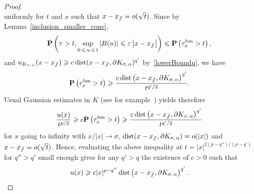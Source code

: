 \documentclass[AHL,Unicode,longabstracts,published]{cedram}
\DeclareMathOperator{\bm}{bm}
\DeclareMathOperator{\dist}{dist}
\newcommand{\pr}{\mathbf{P}}
\renewcommand{\epsilon}{\varepsilon}
\renewcommand{\leq}{\leqslant}
\renewcommand{\geq}{\geqslant}
\newcommand{\sslash}{\slash\mkern-6.4mu\slash}
\begin{document}
\begin{proof}
\[\]
uniformly for $t$ and $x$ such that $x-x_{\sslash}=o(\sqrt{t})$. Since by Lemma~\ref{inclusion_smaller_cone},
\[
\pr\left(\tau>t, \sup_{0\,\leq\,u\,\leq\,t}|B(u)|\leq \epsilon \left|x-x_{\sslash}\right|\right)\leq \pr\left(\tau^{\bm}_{x}>t\right),
\]
and $u_{K_{\sigma,\,\alpha}}(x-x_{\sslash})\geq c \dist(x-x_{\sslash},\partial K_{\sigma,\,\alpha})^{q'}$ by~\eqref{lowerBoundu}, we have
\[
\pr\left(\tau^{\bm}_{x}>t\right)\geq \frac{c \dist\left(x-x_{\sslash},\partial K_{\sigma,\,\alpha}\right)^{q'}}{t^{q'/2}}.
\]
Usual Gaussian estimates in $K$ (see for example~\cite[Appendix~A]{RaTa-20}) yields therefore
\[
\frac{u(x)}{t^{p/2}}\geq c\pr\left(\tau_{x}^{\bm}>t\right)\geq \frac{c\dist\left(x-x_{\sslash},\partial K_{\sigma,\,\alpha}\right)^{q'}}{t^{q'/2}}
\]
for $x$ going to infinity with $x/| x|\rightarrow \sigma$, $\dist(x-x_{\sslash},\partial K_{\sigma,\,\alpha})=o(| x |)$ and $x-x_{\sslash}=o(\sqrt{t})$. Hence, evaluating the above inequality at $t=|x| ^{2(p-q'')/(p-q')}$ for $q''>q'$ small enough gives for any $q'>q$ the existence of $c>0$ such that
\[
u(x)\geq c |x|^{p-q''}\dist\left(x-x_{\sslash},\partial K_{\sigma,\,\alpha}\right)^{q'}.\qedhere
\]
\end{proof}
\vspace{40pt}


\end{document}
